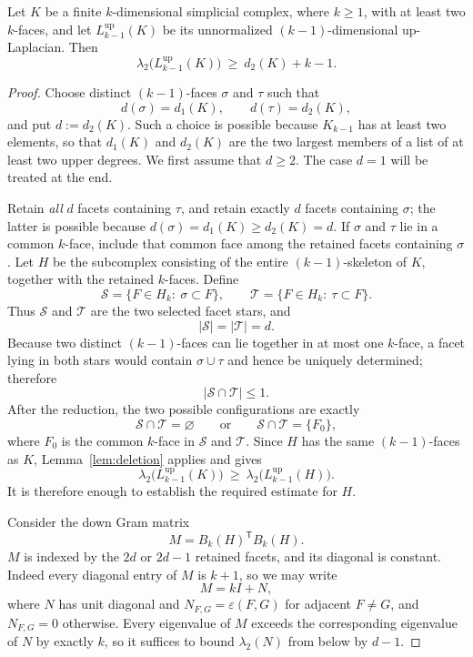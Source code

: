 \documentclass[10pt,a4paper]{amsart}
\newcommand{\Lup}{L^{\mathrm{up}}}
\newcommand{\Sset}{\mathcal S}
\newcommand{\T}{\mathsf{T}}
\newcommand{\Tset}{\mathcal T}
\newcommand{\eps}{\varepsilon}
\begin{document}
\begin{theorem}\label{thm:main}
Let $K$ be a finite $k$-dimensional simplicial complex, where $k\ge1$, with at least two
$k$-faces, and let $\Lup_{k-1}(K)$ be its unnormalized $(k-1)$-dimensional up-Laplacian. Then
\[
  \lambda_2\bigl(\Lup_{k-1}(K)\bigr)\ \ge\ d_2(K)+k-1 .
\]
\end{theorem}

\begin{proof}
Choose distinct $(k-1)$-faces $\sigma$ and $\tau$ such that
\[
  d(\sigma)=d_1(K),\qquad d(\tau)=d_2(K),
\]
and put $d:=d_2(K)$. Such a choice is possible because $K_{k-1}$ has at least two elements, so
that $d_1(K)$ and $d_2(K)$ are the two largest members of a list of at least two upper degrees.
We first assume that $d\ge2$. The case $d=1$ will be treated at the end. 

\medskip
\noindent

Retain \emph{all} $d$ facets containing $\tau$, and retain exactly $d$ facets containing
$\sigma$; the latter is possible because $d(\sigma)=d_1(K)\ge d_2(K)=d$. If $\sigma$ and $\tau$
lie in a common $k$-face, include that common face among the retained facets containing
$\sigma$. Let $H$ be the subcomplex consisting of the entire $(k-1)$-skeleton of $K$, together
with the retained $k$-faces. Define
\[
  \Sset=\{F\in H_k:\ \sigma\subset F\},\qquad \Tset=\{F\in H_k:\ \tau\subset F\} .
\]
Thus $\Sset$ and $\Tset$ are the two selected facet stars, and
\[
  |\Sset|=|\Tset|=d .
\]
Because two distinct $(k-1)$-faces can lie together in at most one $k$-face, a facet lying in
both stars would contain $\sigma\cup\tau$ and hence be uniquely determined; therefore
\[
  |\Sset\cap\Tset|\le1 .
\]
After the reduction, the two possible configurations are exactly
\[
  \Sset\cap\Tset=\varnothing \qquad\text{or}\qquad \Sset\cap\Tset=\{F_0\},
\]
where $F_0$ is the common $k$-face in $\Sset$ and $\Tset$. Since $H$ has the same $(k-1)$-faces
as $K$, Lemma~\ref{lem:deletion} applies and gives
\[
  \lambda_2\bigl(\Lup_{k-1}(K)\bigr)\ \ge\ \lambda_2\bigl(\Lup_{k-1}(H)\bigr) .
\]
It is therefore enough to establish the required estimate for $H$.

\medskip
\noindent

Consider the down Gram matrix
\[
  M={B_k(H)}^{\T}B_k(H) .
\]
 $M$ is
indexed by the $2d$ or $2d-1$ retained facets, and its diagonal is constant. Indeed every
diagonal entry of $M$ is $k+1$, so we may write
\[
  M=kI+N ,
\]
where $N$ has unit diagonal and $N_{F,G}=\eps(F,G)$ for adjacent $F\ne G$, and $N_{F,G}=0$
otherwise. Every eigenvalue of $M$ exceeds the corresponding eigenvalue of $N$ by exactly $k$,
so it suffices to bound $\lambda_2(N)$ from below by $d-1$.


\end{proof}
\end{document}
